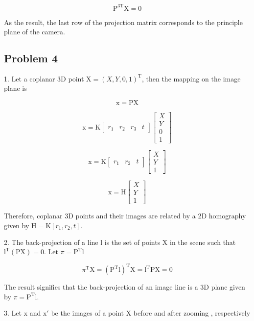 \documentclass[conference]{IEEEtran}
\begin{document}
\[  \mathrm{P}^{3\mathrm{T}}\mathrm{X} = 0 \]

As the result, the last row of the projection matrix corresponds to the principle plane of the camera.

\subsection{Problem 4}

1. Let a coplanar 3D point  \( \mathrm{X} = (X, Y , 0, 1)^\mathrm{T} \), then the mapping on the image plane is 

\[  \mathrm{x} = \mathrm{P}\mathrm{X} \]

\[  \mathrm{x} = \mathrm{K}\begin{bmatrix}
r_{1} & r_{2} & r_{3} & t
\end{bmatrix}\begin{bmatrix}
X \\
Y \\
0 \\
1
\end{bmatrix} \]

\[  \mathrm{x} = \mathrm{K}\begin{bmatrix}
r_{1} & r_{2} & t
\end{bmatrix}\begin{bmatrix}
X \\
Y \\
1
\end{bmatrix} \]

\[  \mathrm{x} = \mathrm{H}\begin{bmatrix}
X \\
Y \\
1
\end{bmatrix} \]

Therefore, coplanar 3D points and their images are related by a 2D homography given by \( \mathrm{H} = \mathrm{K}[r_1, r_2, t] \).

2. The back-projection of a line \( \mathrm{l} \) is the set of points \( \mathrm{X} \) in the scene such that \( \mathrm{l}^\mathrm{T}(\mathrm{P}\mathrm{X}) = 0 \). Let \( \pi = \mathrm{P}^\mathrm{T}\mathrm{l} \)

\[ \pi^\mathrm{T}\mathrm{X} = (\mathrm{P}^\mathrm{T}\mathrm{l})^\mathrm{T}\mathrm{X} =
\mathrm{l}^\mathrm{T}\mathrm{P}\mathrm{X} = 0 \]

The result signifies that the back-projection of an image line is a 3D plane given by  \( \pi = \mathrm{P}^\mathrm{T}\mathrm{l} \).

3. Let \( \mathrm{x} \) and \( \mathrm{x}{'} \) be the images of a point \( \mathrm{X} \) before and after zooming , respectively
\end{document}
